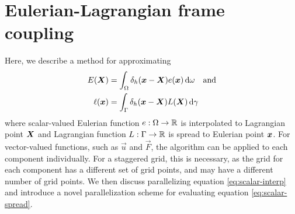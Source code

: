 \section{Eulerian-Lagrangian frame coupling}

Here, we describe a method for approximating
\begin{align}
    \label{eq:scalar-interp}
    E(\vec{X}) &= \int_\domain \delta_h(\vec{x}-\vec{X})e(\vec{x}) \d\omega \quad \text{and}\\
    \label{eq:scalar-spread}
    \ell(\vec{x}) &= \int_\interface \delta_h(\vec{x}-\vec{X})L(\vec{X}) \d\gamma
\end{align}
where scalar-valued Eulerian function $e:\Omega\to\mathbb{R}$ is interpolated
to Lagrangian point $\boldsymbol{X}$ and Lagrangian function $L:\Gamma\to\mathbb{R}$ is
spread to Eulerian point $\boldsymbol{x}$. For vector-valued functions, such as $\vec{u}$
and $\vec{F}$, the algorithm can be applied to each component individually. For
a staggered grid, this is necessary, as the grid for each component has a
different set of grid points, and may have a different number of grid points.
We then discuss parallelizing equation \eqref{eq:scalar-interp} and introduce a
novel parallelization scheme for evaluating equation \eqref{eq:scalar-spread}.




